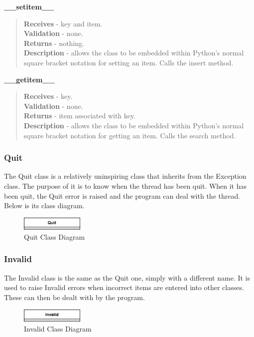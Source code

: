 \documentclass[titlepage]{article}
\begin{document}
\textbf{\_\_setitem\_\_}
\begin{quote}
\textbf{Receives} - key and item. \\
\textbf{Validation} - none.\\
\textbf{Returns} - nothing. \\
\textbf{Description} - allows the class to be embedded within Python's normal square bracket notation for setting an item. Calls the insert method.
\end{quote}

\textbf{\_\_getitem\_\_}
\begin{quote}
\textbf{Receives} - key. \\
\textbf{Validation} - none.\\
\textbf{Returns} - item associated with key. \\
\textbf{Description} - allows the class to be embedded within Python's normal square bracket notation for getting an item. Calls the search method.
\end{quote}

\subsubsection{Quit}

The Quit class is a relatively uninspiring class that inherits from the Exception class. The purpose of it is to know when the thread has been quit. When it has been quit, the Quit error is raised and the program can deal with the thread. Below is its class diagram.

\begin{figure}[H]
  \centering
  \includegraphics[width=3cm]{quitcd.png}
  \caption{Quit Class Diagram}
  \label{fig:dijk}
\end{figure}

\subsubsection{Invalid}

The Invalid class is the same as the Quit one, simply with a different name. It is used to raise Invalid errors when incorrect items are entered into other classes. These can then be dealt with by the program.

\begin{figure}[H]
  \centering
  \includegraphics[width=3cm]{invalidcd.png}
  \caption{Invalid Class Diagram}
  \label{fig:dijk}
\end{figure}
\end{document}
